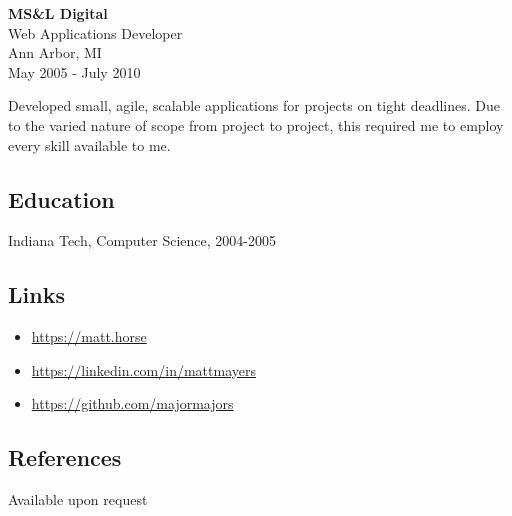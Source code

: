 \documentclass[]{article}
\providecommand{\tightlist}{%
  \setlength{\itemsep}{0pt}\setlength{\parskip}{0pt}}
\begin{document}
\textbf{MS\&L Digital}\\
Web Applications Developer\\
Ann Arbor, MI\\
May 2005 - July 2010

Developed small, agile, scalable applications for projects on tight
deadlines. Due to the varied nature of scope from project to project,
this required me to employ every skill available to me.

\subsection{Education}\label{education}

Indiana Tech, Computer Science, 2004-2005

\subsection{Links}\label{links}

\begin{itemize}
\tightlist
\item
  \url{https://matt.horse}
\item
  \url{https://linkedin.com/in/mattmayers}
\item
  \url{https://github.com/majormajors}
\end{itemize}

\subsection{References}\label{references}

Available upon request
\end{document}
